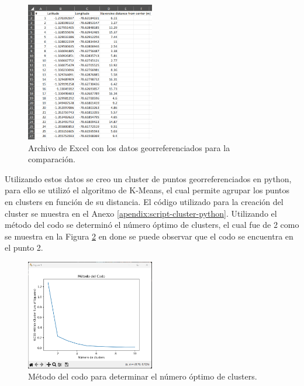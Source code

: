 \begin{figure}[H]
    \centering
    \includegraphics[width=0.5\textwidth]{chapters/III-resultados-y-discusion/resources/images/archivo-excel-georreferenciacion.png}
    \caption{Archivo de Excel con los datos georreferenciados para la comparación.}
    \label{fig:archivo-excel-georreferenciacion}
\end{figure}

Utilizando estos datos se creo un cluster de puntos georreferenciados en python, para ello se utilizó el algoritmo de K-Means, el cual
permite agrupar los puntos en clusters en función de su distancia. El código utilizado para la creación del cluster se muestra en el
Anexo \ref{apendix:script-cluster-python}. Utilizando el método del codo se determinó el número óptimo de clusters, el cual fue de 2 como
se muestra en la Figura \ref{fig:metodo-del-codo} en done se puede observar que el codo se encuentra en el punto 2.

%     

\begin{figure}[H]
    \centering
    \includegraphics[width=0.5\textwidth]{chapters/III-resultados-y-discusion/resources/images/metodo-del-codo.png}
    \caption{Método del codo para determinar el número óptimo de clusters.}
    \label{fig:metodo-del-codo}
\end{figure}

